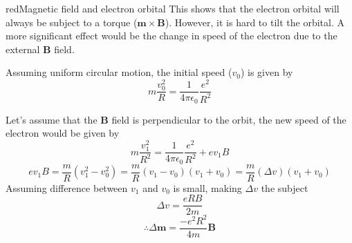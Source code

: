 \documentclass[12pt,a4paper]{extreport}
\numberwithin{equation}{chapter}
\begin{document}
\begin{mybox}{red}{Magnetic field and electron orbital}
        This shows that the electron orbital will always be subject to a torque ($\mathbf{m} \times \mathbf{B}$). However, it is hard to tilt the orbital. A more significant effect would be the change in speed of the electron due to the external $\mathbf{B}$ field. 
        
        Assuming uniform circular motion, the initial speed ($v_0$) is given by
        \begin{equation}
            m \frac{v_0^2}{R}=\frac{1}{4\pi\epsilon_0}\frac{e^2}{R^2}
        \end{equation}

        Let's assume that the  $\mathbf{B}$ field is perpendicular to the orbit, the new speed of the electron would be given by
        \begin{equation}
            m \frac{v_1^2}{R^2}=\frac{1}{4\pi\epsilon_0}\frac{e^2}{R^2}+ev_1B
        \end{equation}
        \begin{equation}
            ev_1B=\frac{m}{R}(v_1^2-v_0^2)=\frac{m}{R}(v_1-v_0)(v_1+v_0)=\frac{m}{R}(\Delta v)(v_1+v_0)
        \end{equation}
        Assuming difference between $v_1$ and $v_0$ is small, making $\Delta v$ the subject
        \begin{equation}
            \Delta v = \frac{eRB}{2m}
        \end{equation}
        \begin{equation}   
            \boxed{\therefore \Delta \mathbf{m}=\frac{-e^2 R^2}{4m} \mathbf{B}}
        \end{equation}
    \end{mybox}
\end{document}
